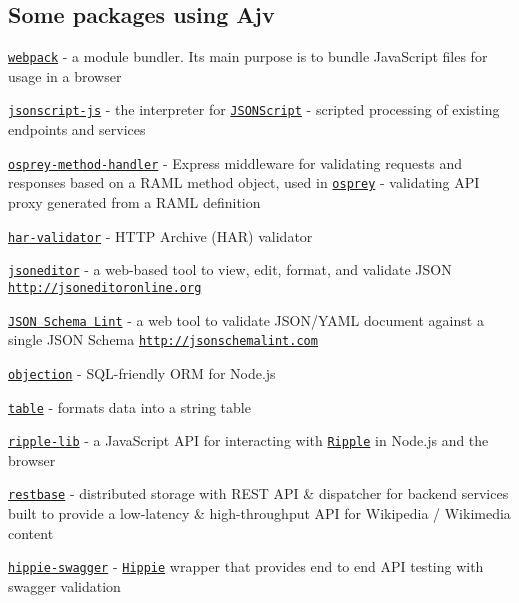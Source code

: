 \subsection*{Some packages using Ajv}


\begin{DoxyItemize}
\item \href{https://github.com/webpack/webpack}{\tt webpack} -\/ a module bundler. Its main purpose is to bundle Java\+Script files for usage in a browser
\item \href{https://github.com/JSONScript/jsonscript-js}{\tt jsonscript-\/js} -\/ the interpreter for \href{http://www.jsonscript.org}{\tt J\+S\+O\+N\+Script} -\/ scripted processing of existing endpoints and services
\item \href{https://github.com/mulesoft-labs/osprey-method-handler}{\tt osprey-\/method-\/handler} -\/ Express middleware for validating requests and responses based on a R\+A\+ML method object, used in \href{https://github.com/mulesoft/osprey}{\tt osprey} -\/ validating A\+PI proxy generated from a R\+A\+ML definition
\item \href{https://github.com/ahmadnassri/har-validator}{\tt har-\/validator} -\/ H\+T\+TP Archive (H\+AR) validator
\item \href{https://github.com/josdejong/jsoneditor}{\tt jsoneditor} -\/ a web-\/based tool to view, edit, format, and validate J\+S\+ON \href{http://jsoneditoronline.org}{\tt http\+://jsoneditoronline.\+org}
\item \href{https://github.com/nickcmaynard/jsonschemalint}{\tt J\+S\+ON Schema Lint} -\/ a web tool to validate J\+S\+O\+N/\+Y\+A\+ML document against a single J\+S\+ON Schema \href{http://jsonschemalint.com}{\tt http\+://jsonschemalint.\+com}
\item \href{https://github.com/vincit/objection.js}{\tt objection} -\/ S\+Q\+L-\/friendly O\+RM for Node.\+js
\item \href{https://github.com/gajus/table}{\tt table} -\/ formats data into a string table
\item \href{https://github.com/ripple/ripple-lib}{\tt ripple-\/lib} -\/ a Java\+Script A\+PI for interacting with \href{https://ripple.com}{\tt Ripple} in Node.\+js and the browser
\item \href{https://github.com/wikimedia/restbase}{\tt restbase} -\/ distributed storage with R\+E\+ST A\+PI \& dispatcher for backend services built to provide a low-\/latency \& high-\/throughput A\+PI for Wikipedia / Wikimedia content
\item \href{https://github.com/CacheControl/hippie-swagger}{\tt hippie-\/swagger} -\/ \href{https://github.com/vesln/hippie}{\tt Hippie} wrapper that provides end to end A\+PI testing with swagger validation

\end{DoxyItemize}
